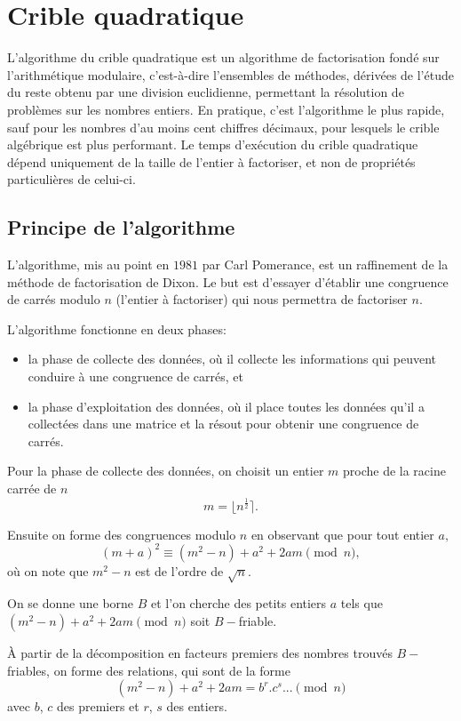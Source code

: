 \documentclass[french, 12pt, titlepage]{article}
\newenvironment{itemH}[0]{\begin{itemize}[label=$\bullet$, font=\color{black} \large]}{\end{itemize}}
\begin{document}
\section{Crible quadratique}

L'algorithme du crible quadratique est un algorithme de factorisation fondé sur l'arithmétique modulaire, c'est-à-dire l'ensembles de méthodes, dérivées de l'étude du reste obtenu par une division euclidienne, permettant la résolution de problèmes sur les nombres entiers. En pratique, c'est l'algorithme le plus rapide, sauf pour les nombres d'au moins cent chiffres décimaux, pour lesquels le crible algébrique est plus performant.
Le temps d'exécution du crible quadratique dépend uniquement de la taille de l'entier à factoriser, et non de propriétés particulières de celui-ci.

\subsection{Principe de l'algorithme}

L'algorithme, mis au point en $1981$ par Carl Pomerance, est un raffinement de la méthode de factorisation de Dixon. Le but est d'essayer d'établir une congruence de carrés modulo $n$ (l'entier à factoriser) qui nous permettra de factoriser $n.$

L'algorithme fonctionne en deux phases:
\begin{itemH}
\item la phase de collecte des données, où il collecte les informations qui peuvent conduire à une congruence de carrés, et
\item la phase d'exploitation des données, où il place toutes les données qu'il a collectées dans une matrice et la résout pour obtenir une congruence de carrés.
\end{itemH}

Pour la phase de collecte des données, on choisit un entier $m$ proche de la racine carrée de $n$ \[ m = \lfloor n^{\frac{1}{2}} \rceil .\]

Ensuite on forme des congruences modulo $n$ en observant que pour tout entier $a,$ \[ (m + a)^2 \equiv (m^2 - n) + a^2 + 2am \pmod n , \] où on note que $m^2 - n$ est de l'ordre de $\sqrt{n}.$

On se donne une borne $B$ et l'on cherche des petits entiers $a$ tels que $(m^2 - n) + a^2 + 2am \pmod n$ soit $B-$friable.

{\`A} partir de la décomposition en facteurs premiers des nombres trouvés $B-$friables, on forme des relations, qui sont de la forme \[(m^2 - n) + a^2 + 2am = b^r.c^s... \pmod n\] avec $b$, $c$ des premiers et $r$, $s$ des entiers.
\end{document}
